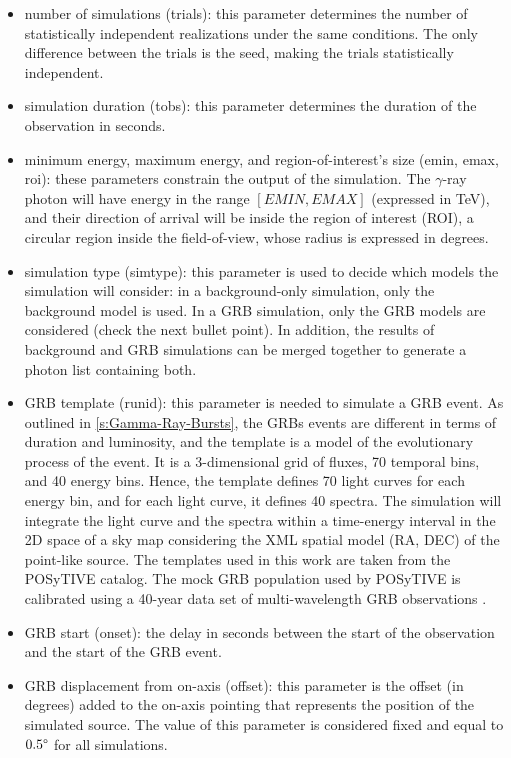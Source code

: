 \begin{itemize}
    \item number of simulations (trials): this parameter determines the number of statistically independent realizations under the same conditions. The only difference between the trials is the seed, making the trials statistically independent.
    \item simulation duration (tobs): this parameter determines the duration of the observation in seconds.
    \item minimum energy, maximum energy, and region-of-interest's size (emin, emax, roi): these parameters constrain the output of the simulation. The $\gamma$-ray photon will have energy in the range $[EMIN, EMAX]$ (expressed in TeV), and their direction of arrival will be inside the region of interest (ROI), a circular region inside the field-of-view, whose radius is expressed in degrees.
    \item simulation type (simtype): this parameter is used to decide which models the simulation will consider: in a background-only simulation, only the background model is used. In a GRB simulation, only the GRB models are considered (check the next bullet point). In addition, the results of background and GRB simulations can be merged together to generate a photon list containing both.  
    \item GRB template (runid): this parameter is needed to simulate a GRB event. As outlined in \autoref{s:Gamma-Ray-Bursts}, the GRBs events are different in terms of duration and luminosity, and the template is a model of the evolutionary process of the event. It is a 3-dimensional grid of fluxes, 70 temporal bins, and 40 energy bins. Hence, the template defines 70 light curves for each energy bin, and for each light curve, it defines 40 spectra. The simulation will integrate the light curve and the spectra within a time-energy interval in the 2D space of a sky map considering the XML spatial model (RA, DEC) of the point-like source. The templates used in this work are taken from the POSyTIVE catalog. The mock GRB population used by POSyTIVE is calibrated using a 40-year data set of multi-wavelength GRB observations \cite{Bernardini_2019}.
    \item GRB start (onset): the delay in seconds between the start of the observation and the start of the GRB event.
    \item GRB displacement from on-axis (offset): this parameter is the offset (in degrees) added to the on-axis pointing that represents the position of the simulated source. The value of this parameter is considered fixed and equal to $0.5\degree$ for all simulations. 

\end{itemize}
